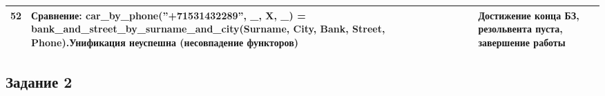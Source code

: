 \documentclass[12pt]{report}
\begin{document}
\begin{table}[H]
\begin{center}
\begin{tabular}{|p{1 cm}|p{11 cm}|p{7 cm}|}
			\hline
			52 &  Сравнение: \newline car\_by\_phone(''+71531432289'', \_, X, \_) = \newline bank\_and\_street\_by\_surname\_and\_city(\newline Surname, City, Bank, Street, Phone).\newline Унификация неуспешна (несовпадение функторов) & Достижение конца БЗ, резольвента пуста, завершение работы \\
			\hline
		\end{tabular}
	\end{center}
\end{table} 

\subsection*{Задание 2}
\end{document}
